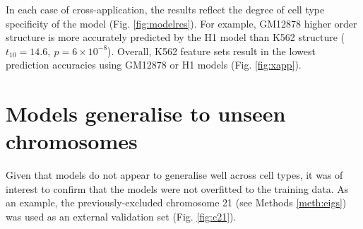 \documentclass[a4paper]{report}
\begin{document}
In each case of cross-application, the results reflect the degree of
cell type specificity of the model (Fig. \ref{fig:modelres}). For
example, GM12878 higher order structure is more accurately predicted by the H1 model
than K562 structure ($t_{10}=14.6,~p = 6 \times 10^{-8}$). Overall, K562 feature sets result in the lowest
prediction accuracies using GM12878 or H1 models
(Fig. \ref{fig:xapp}).


\section{Models generalise to unseen chromosomes}

Given that models do not appear to generalise well across cell types, it was of interest to confirm that the models were
not overfitted to the training data. As an example, the
previously-excluded chromosome 21 (see Methods \ref{meth:eigs}) was used as an external validation
set (Fig. \ref{fig:c21}).
\end{document}
